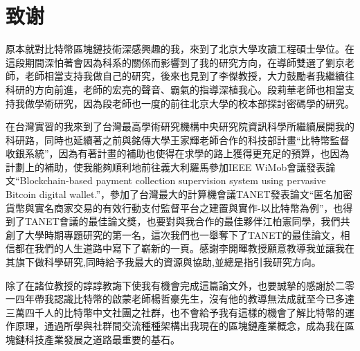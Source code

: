 
\chapter{致谢}
原本就對比特幣區塊鏈技術深感興趣的我，來到了北京大學攻讀工程碩士學位。在這段期間深怕著會因為科系的關係而影響到了我的研究方向，在導師雙選了劉京老師，老師相當支持我做自己的研究，後來也見到了李傑教授，大力鼓勵者我繼續往科研的方向前進，老師的宏亮的聲音、霸氣的指導深植我心。段莉華老師也相當支持我做學術研究，因為段老師也一度的前往北京大學的校本部探討密碼學的研究。

在台灣實習的我來到了台灣最高學術研究機構中央研究院資訊科學所繼續展開我的科研路，同時也延續著之前與銘傳大學王家輝老師合作的科技部計畫“比特幣監督收銀系統”，因為有著計畫的補助也使得在求學的路上獲得更充足的預算，也因為計劃上的補助，使我能夠順利地前往義大利羅馬參加IEEE WiMob會議發表論文“Blockchain-based payment collection supervision system using pervasive Bitcoin digital wallet.”\supercite{Blockchain-basedpaymentcollectionsupervisionsystemusingpervasiveBitcoindigitalwallet}，參加了台灣最大的計算機會議TANET發表論文“匿名加密貨幣與實名商家交易的有效行動支付監督平台之建置與實作-以比特幣為例”，也得到了TANET會議的最佳論文獎，也要對與我合作的最佳夥伴江柏憲同學，我們共創了大學時期專題研究的第一名，這次我們也一舉奪下了TANET的最佳論文，相信都在我們的人生道路中寫下了嶄新的一頁。感謝李開暉教授願意教導我並讓我在其旗下做科學研究,同時給予我最大的資源與協助,並總是指引我研究方向。

除了在諸位教授的諄諄教誨下使我有機會完成這篇論⽂外，也要誠摯的感謝於⼆零⼀四年帶我認識⽐特幣的啟蒙⽼師楊哲豪先⽣，沒有他的教導無法成就至今已多達三萬四千⼈的⽐特幣中⽂社團之社群，也不會給予我有這樣的機會了解⽐特幣的運作原理，通過所學與社群間交流種種架構出我現在的區塊鏈產業概念，成為我在區塊鏈科技產業發展之道路最重要的基⽯。
